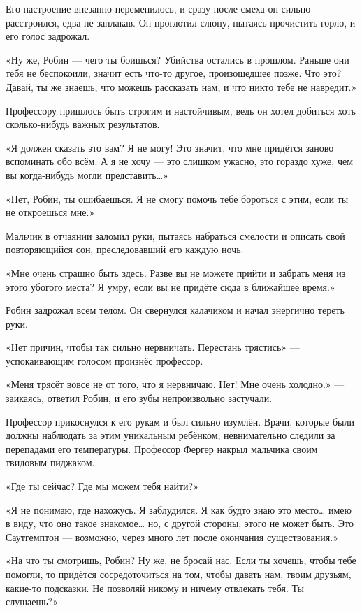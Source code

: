 \documentclass[a5paper, 9pt,
final, openany, twoside=true]{memoir}
\begin{document}
Его настроение внезапно переменилось, и сразу после смеха он сильно расстроился, едва не заплакав. Он проглотил слюну, пытаясь прочистить горло, и его голос задрожал.

«Ну же, Робин — чего ты боишься? Убийства остались в прошлом. Раньше они тебя не беспокоили, значит есть что-то другое, произошедшее позже. Что это? Давай, ты же знаешь, что можешь рассказать нам, и что никто тебе не навредит.»

Профессору пришлось быть строгим и настойчивым, ведь он хотел добиться хоть сколько-нибудь важных результатов.

«Я должен сказать это вам? Я не могу! Это значит, что мне придётся заново вспоминать обо всём. А я не хочу — это слишком ужасно, это гораздо хуже, чем вы когда-нибудь могли представить…»

«Нет, Робин, ты ошибаешься. Я не смогу помочь тебе бороться с этим, если ты не откроешься мне.»

Мальчик в отчаянии заломил руки, пытаясь набраться смелости и описать свой повторяющийся сон, преследовавший его каждую ночь.

«Мне очень страшно быть здесь. Разве вы не можете прийти и забрать меня из этого убогого места? Я умру, если вы не придёте сюда в ближайшее время.»

Робин задрожал всем телом. Он свернулся калачиком и начал энергично тереть руки.

«Нет причин, чтобы так сильно нервничать. Перестань трястись» — успокаивающим голосом произнёс профессор.

«Меня трясёт вовсе не от того, что я нервничаю. Нет! Мне очень холодно.» — заикаясь, ответил Робин, и его зубы непроизвольно застучали.

Профессор прикоснулся к его рукам и был сильно изумлён. Врачи, которые были должны наблюдать за этим уникальным ребёнком, невнимательно следили за перепадами его температуры. Профессор Фергер накрыл мальчика своим твидовым пиджаком.

«Где ты сейчас? Где мы можем тебя найти?»

«Я не понимаю, где нахожусь. Я заблудился. Я как будто знаю это место… имею в виду, что оно такое знакомое… но, с другой стороны, этого не может быть. Это Саутгемптон — возможно, через много лет после окончания существования.»\bigskip

«На что ты смотришь, Робин? Ну же, не бросай нас. Если ты хочешь, чтобы тебе помогли, то придётся сосредоточиться на том, чтобы давать нам, твоим друзьям, какие-то подсказки. Не позволяй никому и ничему отвлекать тебя. Ты слушаешь?»
\end{document}
